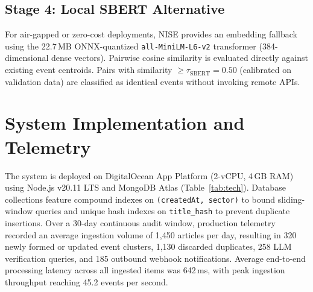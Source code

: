 \documentclass[conference]{IEEEtran}
\begin{document}
\subsection{Stage 4: Local SBERT Alternative}
For air-gapped or zero-cost deployments, NISE provides an embedding fallback using the 22.7\,MB ONNX-quantized \texttt{all-MiniLM-L6-v2} transformer (384-dimensional dense vectors).
Pairwise cosine similarity is evaluated directly against existing event centroids.
Pairs with similarity $\ge \tau_{\text{SBERT}} = 0.50$ (calibrated on validation data) are classified as identical events without invoking remote APIs.

\section{System Implementation and Telemetry}

\begin{table}[!t]
\centering
\caption{Production Technology Stack}
\label{tab:tech}
\end{table}

The system is deployed on DigitalOcean App Platform (2-vCPU, 4\,GB RAM) using Node.js v20.11 LTS and MongoDB Atlas (Table~\ref{tab:tech}).
Database collections feature compound indexes on \texttt{(createdAt, sector)} to bound sliding-window queries and unique hash indexes on \texttt{title\_hash} to prevent duplicate insertions.
Over a 30-day continuous audit window, production telemetry recorded an average ingestion volume of 1,450 articles per day, resulting in 320 newly formed or updated event clusters, 1,130 discarded duplicates, 258 LLM verification queries, and 185 outbound webhook notifications.
Average end-to-end processing latency across all ingested items was 642\,ms, with peak ingestion throughput reaching 45.2 events per second.
\end{document}
